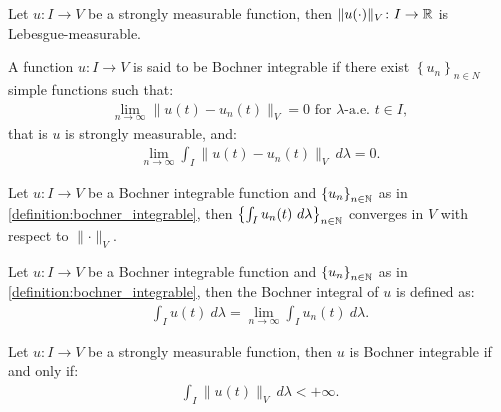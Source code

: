 \begin{lemma}
    Let $u\colon I \rightarrow V$ be a strongly measurable function, then $\lVert u(\cdot) \rVert_V \colon I \rightarrow \mathbb{R}$ is Lebesgue-measurable.
\end{lemma}

\begin{definition} \label{definition:bochner_integrable}
    A function $u\colon I \rightarrow V$ is said to be Bochner integrable if there exist $\left\{ u_n \right\}_{n \in N}$ simple functions such that:
    \begin{gather}
        \lim_{n \rightarrow \infty} \lVert u(t) - u_n(t) \rVert_V = 0 \text{ for } \lambda \text{-a.e. } t \in I,
    \end{gather}
    that is  $u$ is strongly measurable, and:
    \begin{gather}
        \lim_{n \rightarrow \infty} \int_I \lVert u(t) - u_n(t) \rVert_V ~ d \lambda = 0.
    \end{gather}
\end{definition}

\begin{lemma}
    Let $u\colon I \rightarrow V$ be a Bochner integrable function and $\left\{ u_n \right\}_{n \in \mathbb{N}}$ as in \cref{definition:bochner_integrable}, then $\left\{ \int_I u_n(t) ~ d \lambda \right\}_{n \in \mathbb{N}}$ converges in $V$ with respect to $\lVert \cdot \rVert_V$.
\end{lemma}

\begin{definition}
    Let $u\colon I \rightarrow V$ be a Bochner integrable function and $\left\{ u_n \right\}_{n \in \mathbb{N}}$ as in \cref{definition:bochner_integrable}, then the Bochner integral of $u$ is defined as:
    \begin{gather}
        \int_I u(t) ~ d \lambda = \lim_{n \rightarrow \infty} \int_I u_n(t) ~ d \lambda.
    \end{gather}
\end{definition}

\begin{theorem}[Bochner]
    Let $u\colon I \rightarrow V$ be a strongly measurable function, then $u$ is Bochner integrable if and only if:
    \begin{gather}
        \int_I \lVert u(t) \rVert_V ~ d \lambda < + \infty.
    \end{gather}
\end{theorem}

